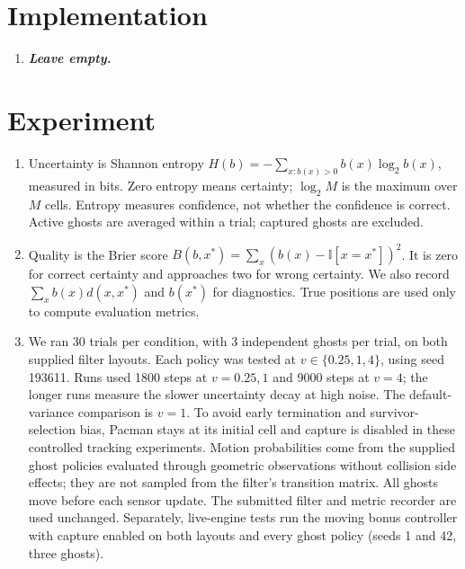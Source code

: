 \documentclass{article}
\begin{document}
\section{Implementation}

\begin{enumerate}[label=\alph*.,leftmargin=*]
    \item \textbf{\textit{Leave empty.}}
\end{enumerate}

\section{Experiment}

\begin{enumerate}[label=\alph*.,leftmargin=*]
    \item Uncertainty is Shannon entropy
    $H(b)=-\sum_{x:b(x)>0}b(x)\log_2b(x)$, measured in bits.
    Zero entropy means certainty; $\log_2M$ is the maximum over $M$ cells.
    Entropy measures confidence, not whether the confidence is correct.
    Active ghosts are averaged within a trial; captured ghosts are excluded.

    \item Quality is the Brier score
    $B(b,x^*)=\sum_x(b(x)-\mathbb{I}[x=x^*])^2$.
    It is zero for correct certainty and approaches two for wrong certainty.
    We also record $\sum_x b(x)d(x,x^*)$ and $b(x^*)$ for diagnostics.
    True positions are used only to compute evaluation metrics.

    \item We ran 30 trials per condition, with
    3 independent ghosts per trial, on both supplied filter layouts.
    Each policy was tested at $v\in\{0.25,1,4\}$, using seed 193611.
    Runs used 1800 steps at $v=0.25,1$ and 9000 steps at $v=4$;
    the longer runs measure the slower uncertainty decay at high noise.
    The default-variance comparison is $v=1$.
    To avoid early termination and survivor-selection bias, Pacman stays
    at its initial cell and capture is disabled in these controlled tracking
    experiments. Motion probabilities come from the supplied ghost policies
    evaluated through geometric observations without collision side effects;
    they are not sampled from the filter's transition matrix.
    All ghosts move before each sensor update. The submitted filter and
    metric recorder are used unchanged. Separately, live-engine tests run
    the moving bonus controller with capture enabled on both layouts and
    every ghost policy (seeds 1 and 42, three ghosts).


\end{enumerate}
\end{document}
